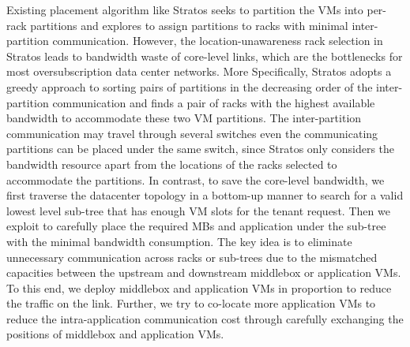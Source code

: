 \documentclass[review]{elsarticle}
\begin{document}
Existing placement algorithm like Stratos \cite{stratos12} seeks to partition the VMs into per-rack partitions and explores to assign partitions to racks with minimal inter-partition communication. 
However, the location-unawareness rack selection in Stratos leads to bandwidth waste of core-level links, which are the bottlenecks for most oversubscription data center networks.
More Specifically, 
Stratos adopts a greedy approach to sorting pairs of partitions in the decreasing
order of the inter-partition communication and finds a pair of racks with the highest available bandwidth to accommodate
these two VM partitions. 
The inter-partition communication 
may travel through several switches %
even the communicating partitions can be placed under the same switch, since Stratos only considers the bandwidth resource apart from the locations of the racks selected to accommodate the partitions.
In contrast, %
to save the core-level bandwidth,
we first traverse the datacenter topology in a bottom-up manner to search for a valid lowest level sub-tree \cite{B11tpd} that has enough VM slots for the tenant request. Then we exploit to carefully place the required MBs and application under the sub-tree with the minimal bandwidth consumption. 
The key idea is to eliminate unnecessary communication across racks or sub-trees due to the mismatched capacities between the upstream and downstream middlebox or application VMs. 
To this end, we deploy middlebox and application VMs in proportion to reduce the traffic on the link.
Further, we try to co-locate more application VMs to reduce the intra-application communication cost through carefully exchanging the positions of middlebox and application VMs.
\end{document}
